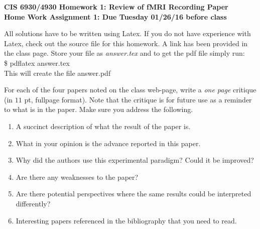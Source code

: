 \documentclass[11pt]{article}
\begin{document}
\begin{center}
{\large {\bf CIS 6930/4930 Homework 1: Review of fMRI Recording Paper}}\\
{\normalsize {\bf Home Work Assignment 1: Due Tuesday 01/26/16 before class}}
\end{center}

All solutions have to be written using Latex. If you do not have experience
with Latex, check out the source file for this homework. A link has been
provided in the class page. Store your file as {\em answer.tex} and to get
the pdf file simply run:\\
\$ pdflatex answer.tex\\
This will create the file answer.pdf

For each of the four papers noted on the class web-page, write a {\em one page}
critique (in $11$ pt, fullpage format). Note that the critique is for future
use as a reminder to what is in the paper. Make sure you address the following.

\begin{enumerate}
\item A succinct description of what the result of the paper is.
\item What in your opinion is the advance reported in this paper.
\item Why did the authors use this experimental paradigm? Could it be improved?
\item Are there any weaknesses to the paper?
\item Are there potential perspectives where the same results could be
interpreted differently?
\item Interesting papers referenced in the bibliography that you need to read.
\end{enumerate}
\end{document}

